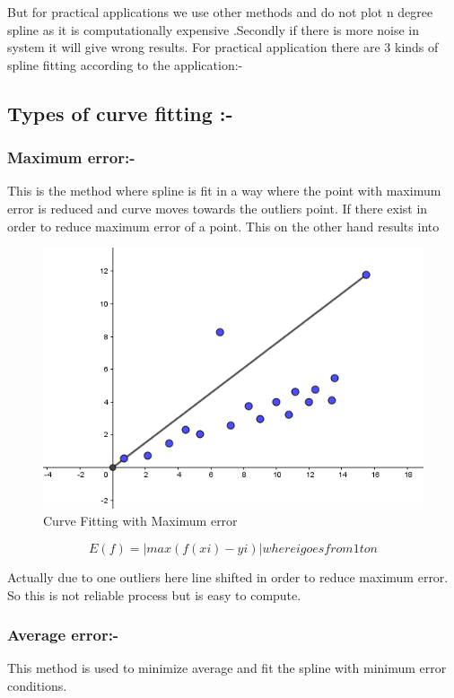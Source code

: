 But for practical applications we use other methods and do not plot n degree spline as it is computationally expensive .Secondly if there is more noise in system it will give wrong results. 
For practical application there are 3 kinds of spline fitting according to the application:-

\subsection{Types of curve fitting :-}
\subsubsection{Maximum error:-}
This is the method where spline is fit in a way where the point with maximum error is reduced and curve moves towards the outliers point. If there exist in order to reduce maximum error of a point. This on the other hand results into

\begin{figure}
\includegraphics{./figures/Maxerror.PNG}
\caption{Curve Fitting with Maximum error }
\end{figure}

\begin{equation}
E(f)=|max (f(xi)-yi)|  where i goes from 1 to n
\end{equation}

Actually due to one outliers here line shifted in order to reduce maximum error. So this is not reliable process but is easy to compute.

\subsubsection{Average error:-}
This method is used to minimize average and fit the spline with minimum error conditions.

